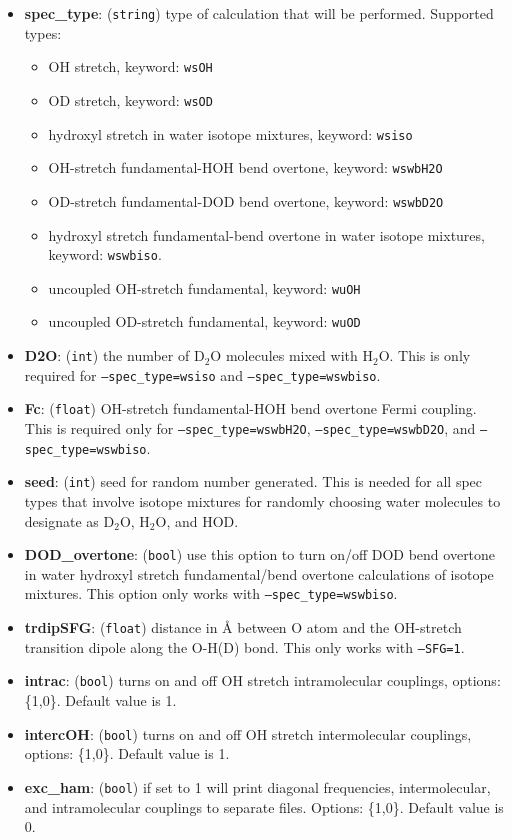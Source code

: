 \documentclass{article}
\begin{document}
\begin{itemize}
\item \textbf{spec\_type}: (\texttt{string}) type of calculation that will be performed. Supported types:
\begin{itemize}
\item OH stretch, keyword: \texttt{wsOH}
\item OD stretch, keyword: \texttt{wsOD}
\item hydroxyl stretch in water isotope mixtures, keyword: \texttt{wsiso}
\item OH-stretch fundamental-HOH bend overtone, keyword: \texttt{wswbH2O}
\item OD-stretch fundamental-DOD bend overtone, keyword: \texttt{wswbD2O}
\item hydroxyl stretch fundamental-bend overtone in water isotope mixtures, keyword: \texttt{wswbiso}.
\item uncoupled OH-stretch fundamental, keyword: \texttt{wuOH}
\item uncoupled OD-stretch fundamental, keyword: \texttt{wuOD}
\end{itemize}

\item \textbf{D2O}: (\texttt{int}) the number of D$_2$O molecules mixed with H$_2$O. This is only required for \texttt{--spec\_type=wsiso}
and  \texttt{--spec\_type=wswbiso}.

\item \textbf{Fc}: (\texttt{float}) OH-stretch fundamental-HOH bend overtone Fermi coupling. This is  required only for \texttt{--spec\_type=wswbH2O},
\texttt{--spec\_type=wswbD2O}, and \texttt{--spec\_type=wswbiso}.

\item \textbf{seed}: (\texttt{int}) seed for random number generated. This is needed for all spec types that involve isotope mixtures for
randomly choosing water molecules to designate as D$_2$O, H$_2$O, and HOD.

\item \textbf{DOD\_overtone}: (\texttt{bool}) use this option to turn on/off DOD bend overtone in water hydroxyl stretch fundamental/bend overtone
calculations of isotope mixtures. This option only works with \texttt{--spec\_type=wswbiso}.

\item \textbf{trdipSFG}: (\texttt{float}) distance in \AA{} between O atom and the
OH-stretch transition dipole along the O-H(D) bond. This only works with  
\texttt{--SFG=1}.

\item \textbf{intrac}: (\texttt{bool}) turns on and off OH stretch intramolecular couplings, options: \{1,0\}. Default value is 1.

\item \textbf{intercOH}: (\texttt{bool}) turns on and off OH stretch intermolecular couplings, options: \{1,0\}. Default value is 1.

\item \textbf{exc\_ham}: (\texttt{bool}) if set to 1 will print diagonal frequencies, intermolecular, and intramolecular couplings to
separate files. Options: \{1,0\}. Default value is 0.

\end{itemize}
\end{document}
